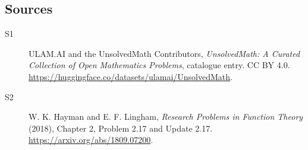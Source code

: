 \documentclass[11pt]{article}
\begin{document}
\subsection{Sources}
\begin{description}
\item[\hypertarget{source:statement:1}{S1}] ULAM.AI and the UnsolvedMath Contributors, \emph{UnsolvedMath: A Curated Collection of Open Mathematics Problems}, catalogue entry. CC BY 4.0. \url{https://huggingface.co/datasets/ulamai/UnsolvedMath}.
\item[\hypertarget{source:statement:2}{S2}] W. K. Hayman and E. F. Lingham, \emph{Research Problems in Function Theory} (2018), Chapter 2, Problem 2.17 and Update 2.17. \url{https://arxiv.org/abs/1809.07200}.
\end{description}
\label{end:statement}
\end{document}

